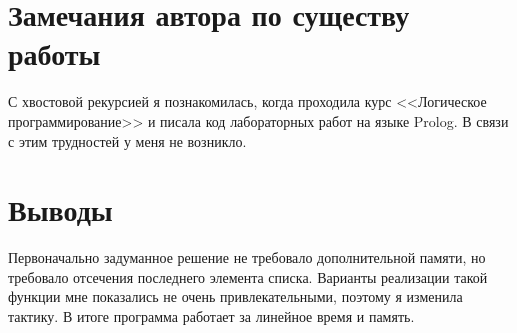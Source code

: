\documentclass[12pt]{article}
\begin{document}

\section{Замечания автора по существу работы}
С хвостовой рекурсией я познакомилась, когда проходила курс <<Логическое программирование>> и писала код лабораторных работ на языке Prolog. В связи с этим трудностей у меня не возникло.

\section{Выводы}
Первоначально задуманное решение не требовало дополнительной памяти, но требовало отсечения последнего элемента списка. Варианты реализации такой функции мне показались не очень привлекательными, поэтому я изменила тактику.
В итоге программа работает за линейное время и память. 
\end{document}

